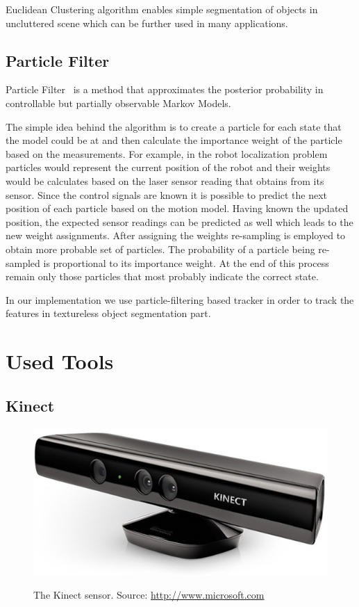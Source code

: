 Euclidean Clustering algorithm enables simple segmentation of objects in uncluttered scene which can be further used in many applications.   

\subsection{Particle Filter}
Particle Filter~\cite{Thrun02d} is a method that approximates the posterior probability in controllable but partially observable Markov Models. 

The simple idea behind the algorithm is to create a particle for each state that the model could be at and then calculate the importance weight of the particle based on the measurements. For example, in the robot localization problem particles would represent the current position of the robot and their weights would be calculates based on the laser sensor reading that obtains from its sensor. Since the control signals are known it is possible to predict the next position of each particle based on the motion model. Having known the updated position, the expected sensor readings can be predicted as well which leads to the new weight assignments. After assigning the weights re-sampling is employed to obtain more probable set of particles. The probability of a particle being re-sampled is proportional to its importance weight. At the end of this process remain only those particles that most probably indicate the correct state.

In our implementation we use particle-filtering based tracker in order to track the features in textureless object segmentation part.      



\section{Used Tools}
\subsection{Kinect}

\begin{figure}

{\includegraphics[width=0.5\columnwidth]{figures/kinect.jpg}}

\caption{The Kinect sensor. Source: \url{http://www.microsoft.com}}
\label{fig:kinect}
\end{figure}

